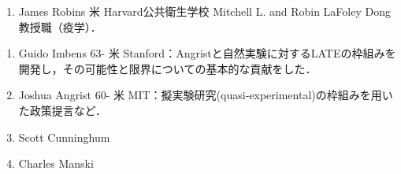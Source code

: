 \documentclass[uplatex,dvipdfmx]{jsreport}
\begin{document}
\begin{history}[疫学分野]\mbox{}
    \begin{enumerate}
        \item James Robins 米 Harvard公共衛生学校 Mitchell L. and Robin LaFoley Dong教授職（疫学）．
    \end{enumerate}
\end{history}

\begin{history}[計量経済学分野]\mbox{}
    \begin{enumerate}
        \item Guido Imbens 63- 米 Stanford：Angristと自然実験に対するLATEの枠組みを開発\cite{Imbens-Angrist94-LATE}し，その可能性と限界についての基本的な貢献をした．
        \item Joshua Angrist 60- 米 MIT：擬実験研究(quasi-experimental)の枠組みを用いた政策提言など．
        \item Scott Cunninghum
        \item Charles Manski
    \end{enumerate}
\end{history}
\end{document}
